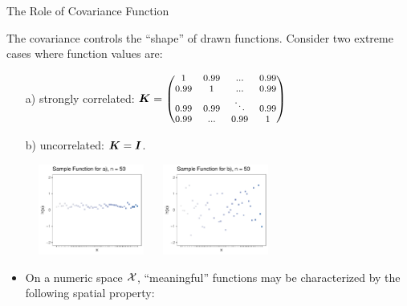 \begin{frame}[c,allowframebreaks]{The Role of Covariance Function}
\vspace{-.03cm}

The covariance controls the ``shape'' of drawn functions. Consider two extreme cases where function values are:
\vspace{-.1cm}
\begin{enumerate}
  \item[a)] strongly correlated: $\bm{K} = \begin{footnotesize}\begin{pmatrix} 1 & 0.99 & ... & 0.99 \\
  0.99 & 1 & ... & 0.99 \\
  0.99 & 0.99 & \ddots & 0.99 \\
  0.99 & ... & 0.99 & 1 \end{pmatrix}\end{footnotesize}$
  \vspace{-.4cm}
  \item[b)] uncorrelated: $\bm{K} = \boldsymbol{I}$.
\end{enumerate}

\begin{figure}
  \includegraphics[width=0.31\textwidth]{figure_man/discrete/example_extreme_50-1.pdf} ~~  \includegraphics[width=0.31\textwidth]{figure_man/discrete/example_extreme_50-2.pdf}
\end{figure}

\framebreak

\begin{itemize}
  \item On a numeric space $\mathcal{X}$, ``meaningful'' functions may be characterized by the following spatial property:
\end{itemize}


\end{frame}
